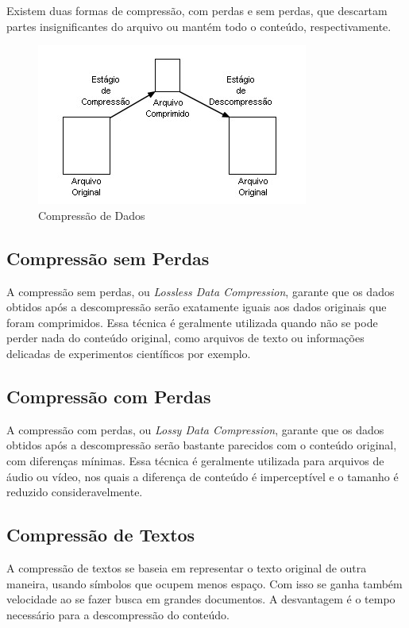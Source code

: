 Existem duas formas de compressão, com perdas e sem perdas, que descartam partes insignificantes do arquivo ou mantém todo o conteúdo, respectivamente.

\begin{figure}[t]
    \centering
    \includegraphics{Images/Compressao.jpg}
    \caption{Compressão de Dados}\label{fig:compression}
\end{figure}

\subsection{Compressão sem Perdas}

A compressão sem perdas, ou \textit{Lossless Data Compression}, garante que os dados obtidos após a descompressão serão exatamente iguais aos dados originais que foram comprimidos. Essa técnica é geralmente utilizada quando não se pode perder nada do conteúdo original, como arquivos de texto ou informações delicadas de experimentos científicos por exemplo.

\subsection{Compressão com Perdas}

A compressão com perdas, ou \textit{Lossy Data Compression}, garante que os dados obtidos após a descompressão serão bastante parecidos com o conteúdo original, com diferenças mínimas. Essa técnica é geralmente utilizada para arquivos de áudio ou vídeo, nos quais a diferença de conteúdo é imperceptível e o tamanho é reduzido consideravelmente.

\subsection{Compressão de Textos}

A compressão de textos se baseia em representar o texto original de outra maneira, usando símbolos que ocupem menos espaço. Com isso se ganha também velocidade ao se fazer busca em grandes documentos. A desvantagem é o tempo necessário para a descompressão do conteúdo.

